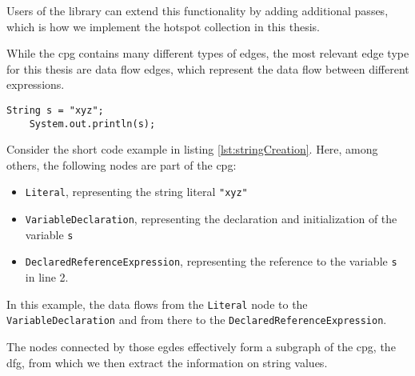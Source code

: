 Users of the library can extend this functionality by adding additional passes, which is how we implement the hotspot collection in this thesis.


While the \ac{cpg} contains many different types of edges, the most relevant edge type for this thesis are data flow edges, which represent the data flow between different expressions.

\begin{lstlisting}[label={lst:stringCreation}, caption={Example code}, captionpos=b]
	String s = "xyz";
	System.out.println(s);
\end{lstlisting}

Consider the short code example in listing \ref{lst:stringCreation}. Here, among others, the following nodes are part of the \ac{cpg}:

\begin{itemize}
	\item \lstinline|Literal|, representing the string literal \lstinline{"xyz"}
	\item \lstinline|VariableDeclaration|, representing the declaration and initialization of the variable \lstinline|s|
	\item \lstinline|DeclaredReferenceExpression|, representing the reference to the variable \lstinline|s| in line 2.
\end{itemize}

In this example, the data flows from the \lstinline|Literal| node to the \lstinline|VariableDeclaration| and from there to the \lstinline|DeclaredReferenceExpression|.

The nodes connected by those egdes effectively form a subgraph of the \ac{cpg}, the \ac{dfg}, from which we then extract the information on string values.



